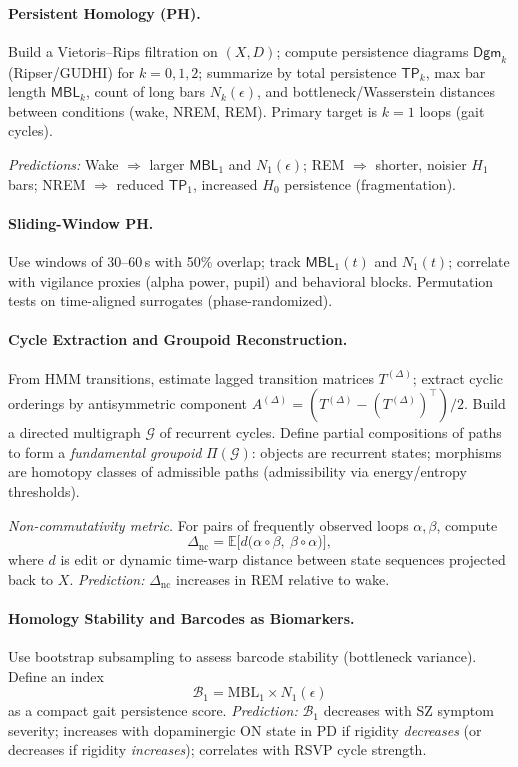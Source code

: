 \documentclass{article}
\begin{document}
\paragraph{Persistent Homology (PH).}
Build a Vietoris--Rips filtration on $(X,D)$; compute persistence diagrams $\mathsf{Dgm}_k$ (Ripser/GUDHI) for $k=0,1,2$; summarize by total persistence $\mathsf{TP}_k$, max bar length $\mathsf{MBL}_k$, count of long bars $N_k(\epsilon)$, and bottleneck/Wasserstein distances between conditions (wake, NREM, REM). Primary target is $k{=}1$ loops (gait cycles).

\emph{Predictions:} Wake $\Rightarrow$ larger $\mathsf{MBL}_1$ and $N_1(\epsilon)$; REM $\Rightarrow$ shorter, noisier $H_1$ bars; NREM $\Rightarrow$ reduced $\mathsf{TP}_1$, increased $H_0$ persistence (fragmentation).

\paragraph{Sliding-Window PH.}
Use windows of 30--60\,s with 50\% overlap; track $\mathsf{MBL}_1(t)$ and $N_1(t)$; correlate with vigilance proxies (alpha power, pupil) and behavioral blocks. Permutation tests on time-aligned surrogates (phase-randomized).

\paragraph{Cycle Extraction and Groupoid Reconstruction.}
From HMM transitions, estimate lagged transition matrices $T^{(\Delta)}$; extract cyclic orderings by antisymmetric component $A^{(\Delta)}=(T^{(\Delta)}-(T^{(\Delta)})^\top)/2$. Build a directed multigraph $\mathcal{G}$ of recurrent cycles. Define partial compositions of paths to form a \emph{fundamental groupoid} $\Pi(\mathcal{G})$: objects are recurrent states; morphisms are homotopy classes of admissible paths (admissibility via energy/entropy thresholds).

\emph{Non-commutativity metric.} For pairs of frequently observed loops $\alpha,\beta$, compute
\[
\Delta_{\mathrm{nc}}=\mathbb{E}\big[ d\big(\alpha\!\circ\!\beta,\ \beta\!\circ\!\alpha\big)\big],
\]
where $d$ is edit or dynamic time-warp distance between state sequences projected back to $X$. \emph{Prediction:} $\Delta_{\mathrm{nc}}$ increases in REM relative to wake.

\paragraph{Homology Stability and Barcodes as Biomarkers.}
Use bootstrap subsampling to assess barcode stability (bottleneck variance). Define an index
\[
\mathcal{B}_1=\mathrm{MBL}_1 \times N_1(\epsilon)
\]
as a compact gait persistence score. \emph{Prediction:} $\mathcal{B}_1$ decreases with SZ symptom severity; increases with dopaminergic ON state in PD if rigidity \emph{decreases} (or decreases if rigidity \emph{increases}); correlates with RSVP cycle strength.
\end{document}
